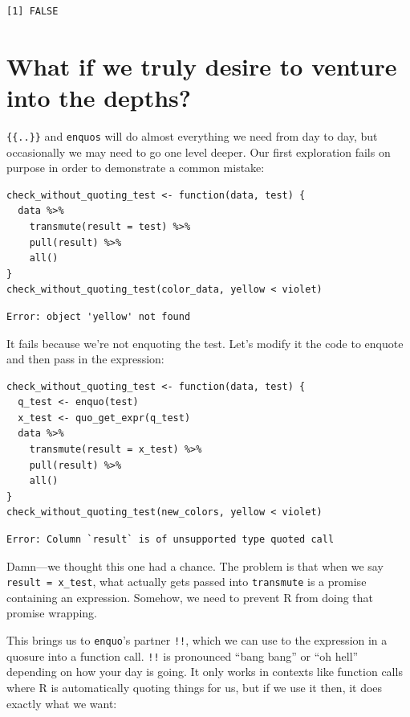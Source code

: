 \begin{lstlisting}
[1] FALSE
\end{lstlisting}

\section{What if we truly desire to venture into the depths?}

\texttt{\{\{..\}\}} and \texttt{enquos} will do almost everything we need from day to day,
but occasionally we may need to go one level deeper.
Our first exploration fails on purpose in order to demonstrate a common mistake:

\begin{lstlisting}
check_without_quoting_test <- function(data, test) {
  data %>%
    transmute(result = test) %>%
    pull(result) %>%
    all()
}
check_without_quoting_test(color_data, yellow < violet)
\end{lstlisting}

\begin{lstlisting}
Error: object 'yellow' not found
\end{lstlisting}

\noindent
It fails because we're not enquoting the test.
Let's modify it the code to enquote and then pass in the expression:

\begin{lstlisting}
check_without_quoting_test <- function(data, test) {
  q_test <- enquo(test)
  x_test <- quo_get_expr(q_test)
  data %>%
    transmute(result = x_test) %>%
    pull(result) %>%
    all()
}
check_without_quoting_test(new_colors, yellow < violet)
\end{lstlisting}

\begin{lstlisting}
Error: Column `result` is of unsupported type quoted call
\end{lstlisting}

Damn---we thought this one had a chance.
The problem is that when we say \texttt{result = x\_test},
what actually gets passed into \texttt{transmute} is a promise containing an expression.
Somehow,
we need to prevent R from doing that promise wrapping.

This brings us to \texttt{enquo}'s partner \texttt{!!},
which we can use to  the expression in a quosure into a function call.
\texttt{!!} is pronounced ``bang bang'' or ``oh hell'' depending on how your day is going.
It only works in contexts like function calls where R is automatically quoting things for us,
but if we use it then,
it does exactly what we want:


